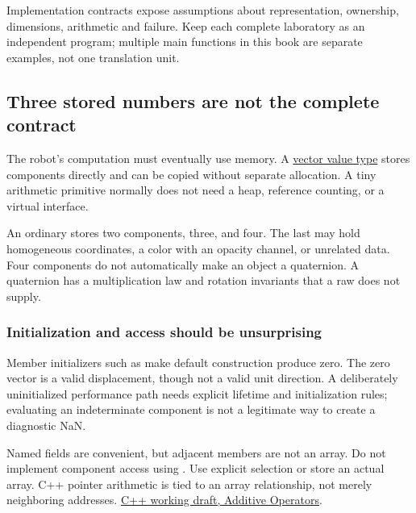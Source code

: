 Implementation contracts expose assumptions about representation, ownership, dimensions, arithmetic and failure. Keep each complete laboratory as an independent program; multiple main functions in this book are separate examples, not one translation unit.

\subsection{Three stored numbers are not the complete contract}\label{02-foundations-ii-ch037-three-stored-numbers-are-not-the-complete-contract}

\hypertarget{02-foundations-ii-ch037-three-stored-numbers-are-not-the-complete-contract}{}

The robot's computation must eventually use memory. A \hyperref[02-foundations-ii-ch037-three-stored-numbers-are-not-the-complete-contract]{vector value type} stores components directly and can be copied without separate allocation. A tiny arithmetic primitive normally does not need a heap, reference counting, or a virtual interface.

An ordinary  stores two components,  three, and  four. The last may hold homogeneous coordinates, a color with an opacity channel, or unrelated data. Four components do not automatically make an object a quaternion. A quaternion has a multiplication law and rotation invariants that a raw  does not supply.

\subsubsection{Initialization and access should be unsurprising}\label{02-foundations-ii-ch037-initialization-and-access-should-be-unsurprising}

\hypertarget{02-foundations-ii-ch037-initialization-and-access-should-be-unsurprising}{}

Member initializers such as  make default construction produce zero. The zero vector is a valid displacement, though not a valid unit direction. A deliberately uninitialized performance path needs explicit lifetime and initialization rules; evaluating an indeterminate component is not a legitimate way to create a diagnostic NaN.

Named fields are convenient, but adjacent members are not an array. Do not implement component access using . Use explicit selection or store an actual array. C++ pointer arithmetic is tied to an array relationship, not merely neighboring addresses. \href{https://eel.is/c++draft/expr.add}{C++ working draft, Additive Operators}.

